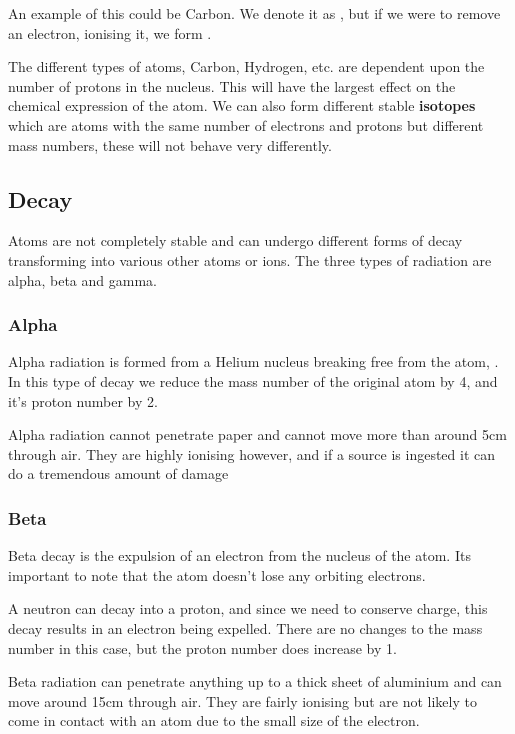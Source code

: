 \documentclass[11pt, titlepage]{article}
\begin{document}
An example of this could be Carbon.  We denote it as 
{\Large{}},
but if we were to remove an electron, ionising it, we form
{{\Large{}}}.

The different types of atoms, Carbon, Hydrogen, etc. are dependent upon the number of protons in the nucleus.  This will have the largest effect on the chemical expression of the atom.  We can also form different stable \textbf{isotopes} which are atoms with the same number of electrons and protons but different mass numbers, these will not behave very differently.


\subsection{Decay}
Atoms are not completely stable and can undergo different forms of decay transforming into various other atoms or ions.  The three types of radiation are alpha, beta and gamma. 

 

\subsubsection*{Alpha}
Alpha radiation is formed from a Helium nucleus breaking free from the atom, {{\Large{}}}.  In this type of decay we reduce the mass number of the original atom by 4, and it's proton number by 2.

Alpha radiation cannot penetrate paper and cannot move more than around 5cm through air.  They are highly ionising however, and if a source is ingested it can do a tremendous amount of damage

\subsubsection*{Beta}
Beta decay is the expulsion of an electron from the nucleus of the atom.  Its important to note that the atom doesn't lose any orbiting electrons.

A neutron can decay into a proton, and since we need to conserve charge, this decay results in an electron being expelled.  There are no changes to the mass number in this case, but the proton number does increase by 1.

Beta radiation can penetrate anything up to a thick sheet of aluminium and can move around 15cm through air.  They are fairly ionising but are not likely to come in contact with an atom due to the small size of the electron.
\end{document}
